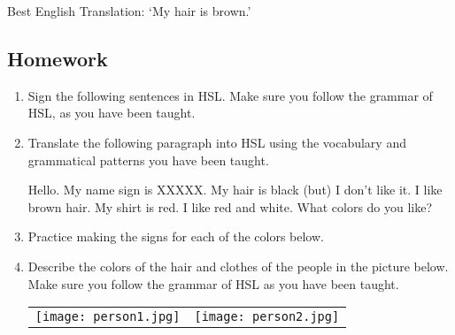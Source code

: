 \documentclass{tufte-book}
\begin{document}
Best English Translation: `My hair is brown.'
\newpage
\subsection{Homework}
\begin{enumerate}
\item Sign the following sentences in HSL.
Make sure you follow the grammar of HSL, as you have been taught.



\item Translate the following paragraph into HSL using the vocabulary and grammatical patterns you have been taught.

\vspace{0.25cm}Hello. My name sign is XXXXX. My hair is black (but) I don’t like it. I like brown hair. My shirt is red. I like red and white. What colors do you like?

\item Practice making the signs for each of the colors below.
\item Describe the colors of the hair and clothes of the people in the picture below. Make sure you follow the grammar of HSL as you have been taught.

\begin{table*}[h!]
\begin{tabular}{c c}
\texttt{[image: person1.jpg]} & \texttt{[image: person2.jpg]} \\

\end{tabular}
\end{table*}



\end{enumerate}
\newpage
\end{document}
